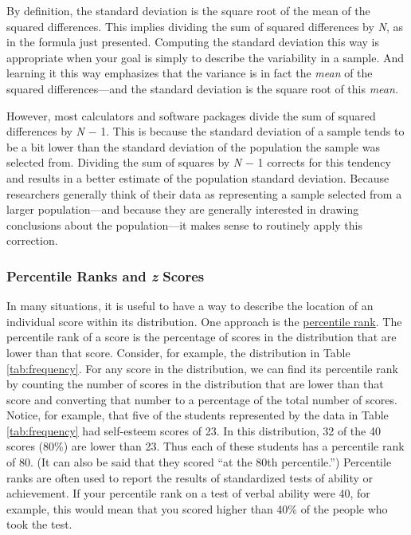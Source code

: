 \documentclass[
]{krantz}
\begin{document}
By definition, the standard deviation is the square root of the mean of the squared differences. This implies dividing the sum of squared differences by \emph{N}, as in the formula just presented. Computing the standard deviation this way is appropriate when your goal is simply to describe the variability in a sample. And learning it this way emphasizes that the variance is in fact the \emph{mean} of the squared differences---and the standard deviation is the square root of this \emph{mean.}

However, most calculators and software packages divide the sum of squared differences by \emph{N} − 1. This is because the standard deviation of a sample tends to be a bit lower than the standard deviation of the population the sample was selected from. Dividing the sum of squares by \emph{N} − 1 corrects for this tendency and results in a better estimate of the population standard deviation. Because researchers generally think of their data as representing a sample selected from a larger population---and because they are generally interested in drawing conclusions about the population---it makes sense to routinely apply this correction.

\hypertarget{percentile-ranks-and-z-scores}{%
\subsubsection*{\texorpdfstring{Percentile Ranks and \emph{z} Scores}{Percentile Ranks and z Scores}}\label{percentile-ranks-and-z-scores}}


In many situations, it is useful to have a way to describe the location of an individual score within its distribution. One approach is the \protect\hyperlink{percentile-rank}{percentile rank}. The percentile rank of a score is the percentage of scores in the distribution that are lower than that score. Consider, for example, the distribution in Table \ref{tab:frequency}. For any score in the distribution, we can find its percentile rank by counting the number of scores in the distribution that are lower than that score and converting that number to a percentage of the total number of scores. Notice, for example, that five of the students represented by the data in Table \ref{tab:frequency} had self-esteem scores of 23. In this distribution, 32 of the 40 scores (80\%) are lower than 23. Thus each of these students has a percentile rank of 80. (It can also be said that they scored ``at the 80th percentile.'') Percentile ranks are often used to report the results of standardized tests of ability or achievement. If your percentile rank on a test of verbal ability were 40, for example, this would mean that you scored higher than 40\% of the people who took the test.
\end{document}
